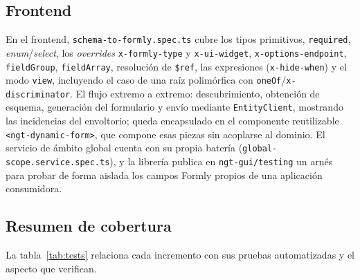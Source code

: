 \subsection{Frontend}
En el frontend, \texttt{schema-\allowbreak to-\allowbreak formly.\allowbreak spec.\allowbreak ts} cubre los tipos primitivos,
\texttt{required}, \emph{enum}/\allowbreak\emph{select}, los \emph{overrides}
\texttt{x-\allowbreak formly-\allowbreak type} y \texttt{x-\allowbreak ui-\allowbreak widget}, \texttt{x-\allowbreak options-\allowbreak endpoint},
\texttt{field\allowbreak Group}, \texttt{field\allowbreak Array}, resolución de \texttt{\$ref}, las
expresiones (\texttt{x-hide-when}) y el modo \texttt{view}, incluyendo el caso
de una raíz polimórfica con \texttt{oneOf}/\texttt{x-\allowbreak discriminator}. El flujo
extremo a extremo: descubrimiento, obtención de esquema, generación del
formulario y envío mediante \texttt{EntityClient}, mostrando las incidencias
del envoltorio; queda encapsulado en el componente reutilizable
\texttt{<ngt-dynamic-form>}, que compone esas piezas sin acoplarse al dominio.
El servicio de ámbito global cuenta con su propia batería
(\texttt{global-\allowbreak scope.\allowbreak service.\allowbreak spec.\allowbreak ts}), y la librería
publica en \texttt{ngt-gui/testing} un arnés para probar de forma aislada los
campos Formly propios de una aplicación consumidora.

\subsection{Resumen de cobertura}
La tabla~\ref{tab:tests} relaciona cada incremento con sus pruebas
automatizadas y el aspecto que verifican.

